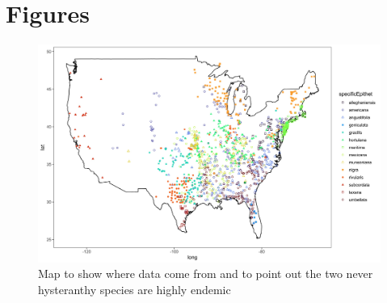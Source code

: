 \documentclass{article}\usepackage[]{graphicx}\usepackage[]{color}
\begin{document}

\noindent  


 




\newpage
\section*{Figures}
    \begin{figure}[h!]
    \centering
 \includegraphics[width=\textwidth]{..//..//Plots/map.jpeg}
    \caption{Map to show where data come from and to point out the two never hysteranthy species are highly endemic}
    \label{fig:mappy}
\end{figure}

\end{document}
